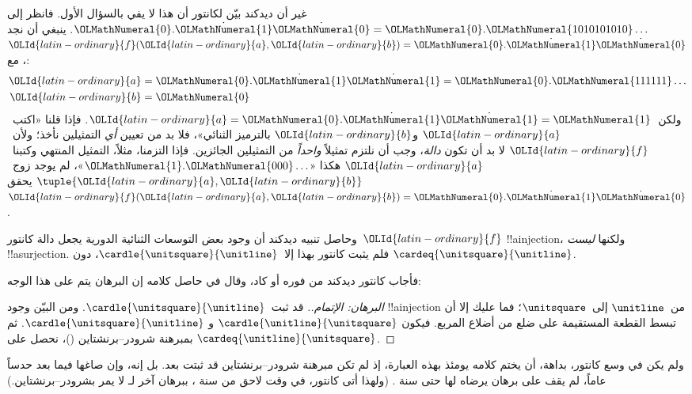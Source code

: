 \documentclass[../../../include/open-logic-section]{subfiles}
\begin{document}
غير أن ديدكند بيّن لكانتور أن هذا لا يفي بالسؤال الأول. فانظر إلى
$\OLMathNumeral{0}.\dot{\OLMathNumeral{1}}\dot{\OLMathNumeral{0}} = \OLMathNumeral{0}.\OLMathNumeral{1010101010}\ldots$. ينبغي أن نجد
$\OLId{latin-ordinary}{f}(\OLId{latin-ordinary}{a},\OLId{latin-ordinary}{b}) = \OLMathNumeral{0}.\dot{\OLMathNumeral{1}}\dot{\OLMathNumeral{0}}$، مع:
\begin{align*}
\OLId{latin-ordinary}{a}&= \OLMathNumeral{0}.\dot{\OLMathNumeral{1}}\dot{\OLMathNumeral{1}} = \OLMathNumeral{0}.\OLMathNumeral{111111}\ldots\\
\OLId{latin-ordinary}{b}&= \OLMathNumeral{0}
\end{align*}
ولكن~$\OLId{latin-ordinary}{a} = \OLMathNumeral{0}.\dot{\OLMathNumeral{1}}\dot{\OLMathNumeral{1}} = \OLMathNumeral{1}$. فإذا قلنا «اكتب~$\OLId{latin-ordinary}{a}$ و$\OLId{latin-ordinary}{b}$ بالترميز
الثنائي»، فلا بد من تعيين \emph{أي} التمثيلين نأخذ؛ ولأن~$\OLId{latin-ordinary}{f}$ لا بد أن
تكون \emph{دالة}، وجب أن نلتزم تمثيلاً \emph{واحداً} من التمثيلين
الجائزين. فإذا التزمنا، مثلاً، التمثيل المنتهي وكتبنا~$\OLId{latin-ordinary}{a}$ هكذا
«$\OLMathNumeral{1}.\OLMathNumeral{000}\ldots$»، لم يوجد زوج~$\tuple{\OLId{latin-ordinary}{a}, \OLId{latin-ordinary}{b}}$ يحقق
$\OLId{latin-ordinary}{f}(\OLId{latin-ordinary}{a}, \OLId{latin-ordinary}{b}) = \OLMathNumeral{0}.\dot{\OLMathNumeral{1}}\dot{\OLMathNumeral{0}}$.

وحاصل تنبيه ديدكند أن وجود بعض التوسعات الثنائية الدورية يجعل دالة
كانتور~$\OLId{latin-ordinary}{f}$ !!a{injection}، ولكنها \emph{ليست} !!a{surjection}. فلم يثبت
كانتور بهذا إلا~$\cardle{\unitsquare}{\unitline}$، دون
$\cardeq{\unitsquare}{\unitline}$.

فأجاب كانتور ديدكند من فوره أو كاد، وقال في حاصل كلامه إن البرهان يتم على
هذا الوجه:

\begin{proof}[البرهان: الإتمام.]
قد ثبت~$\cardle{\unitsquare}{\unitline}$. ومن البيّن وجود !!a{injection}
من~$\unitline$ إلى~$\unitsquare$؛ فما عليك إلا أن تبسط القطعة المستقيمة
على ضلع من أضلاع المربع. فيكون
$\cardle{\unitline}{\unitsquare}$ و
$\cardle{\unitsquare}{\unitline}$. ثم بمبرهنة شرودر--برنشتاين
()، نحصل على
$\cardeq{\unitline}{\unitsquare}$.
\end{proof}

ولم يكن في وسع كانتور، بداهة، أن يختم كلامه يومئذ بهذه العبارة، إذ لم تكن
مبرهنة شرودر--برنشتاين قد ثبتت بعد. بل إنه، وإن صاغها فيما بعد حدساً
عاماً، لم يقف على برهان يرضاه لها حتى سنة . (ولهذا أتى كانتور، في
وقت لاحق من سنة ، ببرهان آخر لـ لا يمر
بشرودر--برنشتاين.)
\end{document}
